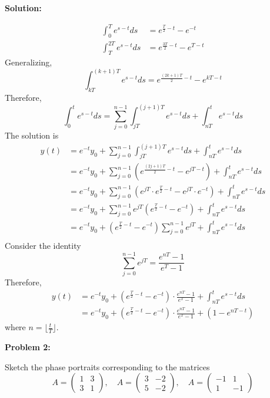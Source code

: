 \documentclass[12pt]{article}
\newenvironment{problem}[1]{
    \textbf{Problem #1:}
}{
    \rmfamily \vspace{2em}
}
\newenvironment{solution}{
    \textbf{Solution:}
    
}{
    
    \vspace{2em}
}
\begin{document}
\begin{solution}
\[\begin{aligned}
            \int_0^T e^{s-t} ds &= e^{\frac{T}{2}-t} - e^{-t} \\
            \int_{T}^{2T} e^{s-t} ds &= e^{\frac{3T}{2}-t} - e^{T-t}
        \end{aligned}
    \]
    Generalizing,
    \[
        \int_{kT}^{(k+1)T} e^{s-t} ds = e^{\frac{(2k+1)T}{2}-t} - e^{kT-t}
    \]
    Therefore,
    \[
        \int_0^t e^{s-t} ds = \sum_{j=0}^{n - 1} \int_{jT}^{(j+1)T} e^{s-t} ds + \int_{nT}^t e^{s-t} ds
    \]
    The solution is
    \[
        \begin{aligned}
            y(t) &= e^{-t}y_0 + \sum_{j=0}^{n-1} \int_{jT}^{(j+1)T} e^{s-t} ds + \int_{nT}^t e^{s-t} ds \\
            &= e^{-t}y_0 + \sum_{j=0}^{n-1} (e^{\frac{(2j+1)T}{2}-t} - e^{jT-t}) + \int_{nT}^t e^{s-t} ds\\
            &= e^{-t}y_0 + \sum_{j=0}^{n-1} (e^{jT} \cdot e^{\frac{T}{2}-t} - e^{jT} \cdot e^{-t}) + \int_{nT}^t e^{s-t} ds \\
            &= e^{-t}y_0 + \sum_{j=0}^{n-1} e^{jT} (e^{\frac{T}{2}-t} - e^{-t}) + \int_{nT}^t e^{s-t} ds \\
            &= e^{-t}y_0 + (e^{\frac{T}{2}-t} - e^{-t}) \sum_{j=0}^{n-1} e^{jT} + \int_{nT}^t e^{s-t} ds \\
        \end{aligned}
    \]
    Consider the identity
    \[
        \sum_{j=0}^{n-1} e^{jT} = \frac{e^{nT} - 1}{e^T - 1}
    \]
    Therefore,
    \[
        \begin{aligned}
            y(t) &= e^{-t}y_0 + (e^{\frac{T}{2}-t} - e^{-t}) \cdot \frac{e^{nT} - 1}{e^T - 1} + \int_{nT}^t e^{s-t} ds \\
            &= e^{-t}y_0 + (e^{\frac{T}{2}-t} - e^{-t}) \cdot \frac{e^{nT} - 1}{e^T - 1} + (1 - e^{nT-t})
        \end{aligned}
    \]
    where \(n = \lfloor \frac{t}{T} \rfloor\).
    
\end{solution}

\newpage

\begin{problem}{2}
    Sketch the phase portraits corresponding to the matrices
    \[
        A = \begin{pmatrix}
            1 & 3 \\
            3 & 1
        \end{pmatrix}, \quad
        A = \begin{pmatrix}
            3 & -2 \\
            5 & -2
        \end{pmatrix}, \quad
        A = \begin{pmatrix}
            -1 & 1 \\
            1 & -1
        \end{pmatrix}
    \]
\end{problem}
\end{document}
